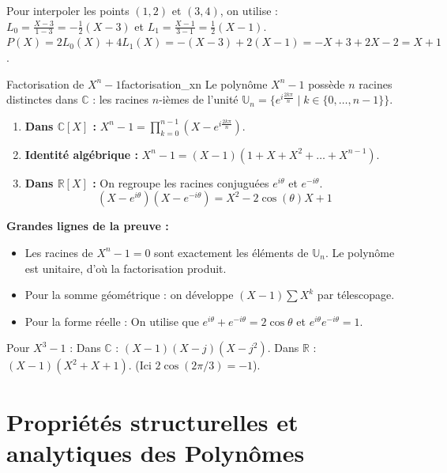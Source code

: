 \documentclass{prepacours}
\begin{document}
\begin{exemple}
    Pour interpoler les points $(1, 2)$ et $(3, 4)$, on utilise :
    $L_0 = \frac{X-3}{1-3} = -\frac{1}{2}(X-3)$ et $L_1 = \frac{X-1}{3-1} = \frac{1}{2}(X-1)$.
    $P(X) = 2 L_0(X) + 4 L_1(X) = -(X-3) + 2(X-1) = -X+3+2X-2 = X+1$.
\end{exemple}

\begin{proposition}{Factorisation de $X^n - 1$}{factorisation_xn}
    Le polynôme $X^n - 1$ possède $n$ racines distinctes dans $\mathbb{C}$ : les racines $n$-ièmes de l'unité $\mathbb{U}_n = \{e^{i \frac{2k\pi}{n}} \mid k \in \{0, \dots, n-1\}\}$.
    \begin{enumerate}
        \item \textbf{Dans $\mathbb{C}[X]$ :} $X^n - 1 = \prod_{k=0}^{n-1} (X - e^{i \frac{2k\pi}{n}})$.
        \item \textbf{Identité algébrique :} $X^n - 1 = (X-1)(1 + X + X^2 + \dots + X^{n-1})$.
        \item \textbf{Dans $\mathbb{R}[X]$ :} On regroupe les racines conjuguées $e^{i\theta}$ et $e^{-i\theta}$.
        \[ (X - e^{i\theta})(X - e^{-i\theta}) = X^2 - 2\cos(\theta)X + 1 \]
       
    \end{enumerate}
\end{proposition}

\noindent \textbf{Grandes lignes de la preuve :}
\begin{itemize}
    \item Les racines de $X^n-1=0$ sont exactement les éléments de $\mathbb{U}_n$. Le polynôme est unitaire, d'où la factorisation produit.
    \item Pour la somme géométrique : on développe $(X-1)\sum X^k$ par télescopage.
    \item Pour la forme réelle : On utilise que $e^{i\theta} + e^{-i\theta} = 2\cos\theta$ et $e^{i\theta}e^{-i\theta} = 1$.
\end{itemize}

\begin{exemple}
    Pour $X^3 - 1$ :
    Dans $\mathbb{C}$ : $(X-1)(X-j)(X-j^2)$.
    Dans $\mathbb{R}$ : $(X-1)(X^2+X+1)$. (Ici $2\cos(2\pi/3) = -1$).
\end{exemple}


\section{Propriétés structurelles et analytiques des Polynômes}
\end{document}
